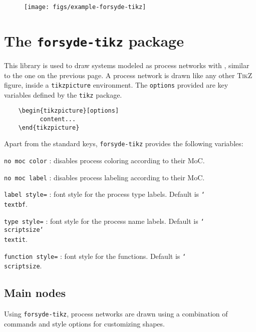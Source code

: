 \begin{figure}[htb]\centering
\texttt{[image: figs/example-forsyde-tikz]}
\end{figure}


\section{The \texttt{forsyde-tikz} package}


This library is used to draw systems modeled as process networks with \ForSyDe, similar to the one on the previous page. A \ForSyDe process network is drawn like any other \textsc{TikZ} figure, inside a \texttt{tikzpicture} environment. The \texttt{options} provided are key variables defined by the \texttt{tikz} package. 

\begin{verbatim}
	\begin{tikzpicture}[options]
          content...
	\end{tikzpicture}
\end{verbatim}

Apart from the standard keys, \texttt{forsyde-tikz} provides the following variables:
\begin{optionslist}
\item \texttt{no moc color} : disables process coloring according to their MoC.
\item \texttt{no moc label} : disables process labeling according to their MoC.
\item \texttt{label style=} : font style for the process type labels. Default is \texttt{\char`\\ textbf}.
\item \texttt{type style=} : font style for the process name labels. Default is \texttt{\char`\\ scriptsize\char`\\textit}.
\item \texttt{function style=} : font style for the functions. Default is \texttt{\char`\\ scriptsize}.
\end{optionslist}

\subsection{Main nodes}

Using \texttt{forsyde-tikz}, process networks are drawn using a combination of commands and style options for customizing shapes. 

